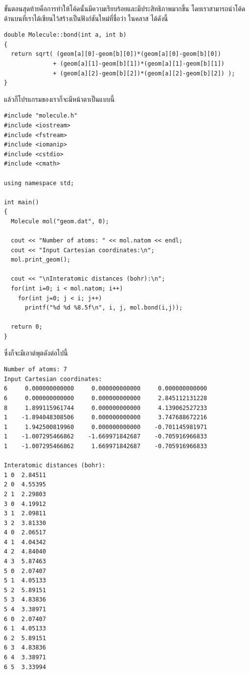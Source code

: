 ขั้นตอนสุดท้ายคือการทำให้โค้ดนั้นมีความเรียบร้อยและมีประสิทธิภาพมากขึ้น โดยเราสามารถนำโค้ดด้านบนที่เราได้เขียนไว้สร้างเป็นฟังก์ชันใหม่ที่ชื่อว่า
 ในคลาส  ได้ดังนี้

\vspace{5pt}

\begin{lstlisting}[style=MyC++]
double Molecule::bond(int a, int b)
{
  return sqrt( (geom[a][0]-geom[b][0])*(geom[a][0]-geom[b][0])
              + (geom[a][1]-geom[b][1])*(geom[a][1]-geom[b][1])
              + (geom[a][2]-geom[b][2])*(geom[a][2]-geom[b][2]) );
}
\end{lstlisting}

\vspace{5pt}

แล้วก็โปรแกรมของเราก็จะมีหน้าตาเป็นแบบนี้

\vspace{5pt}

\begin{lstlisting}[style=MyC++]
#include "molecule.h"
#include <iostream>
#include <fstream>
#include <iomanip>
#include <cstdio>
#include <cmath>

using namespace std;
  
int main()
{
  Molecule mol("geom.dat", 0);
  
  cout << "Number of atoms: " << mol.natom << endl;
  cout << "Input Cartesian coordinates:\n";
  mol.print_geom();
  
  cout << "\nInteratomic distances (bohr):\n";
  for(int i=0; i < mol.natom; i++)
    for(int j=0; j < i; j++)
      printf("%d %d %8.5f\n", i, j, mol.bond(i,j));
      
  return 0;
}
\end{lstlisting}

\vspace{5pt}

\noindent ซึ่งก็จะมีเอาต์พุตดังต่อไปนี้

\vspace{5pt}

\begin{lstlisting}[style=MyC++]
Number of atoms: 7
Input Cartesian coordinates:
6     0.000000000000     0.000000000000     0.000000000000
6     0.000000000000     0.000000000000     2.845112131228
8     1.899115961744     0.000000000000     4.139062527233
1    -1.894048308506     0.000000000000     3.747688672216
1     1.942500819960     0.000000000000    -0.701145981971
1    -1.007295466862    -1.669971842687    -0.705916966833
1    -1.007295466862     1.669971842687    -0.705916966833

Interatomic distances (bohr):
1 0  2.84511
2 0  4.55395
2 1  2.29803
3 0  4.19912
3 1  2.09811
3 2  3.81330
4 0  2.06517
4 1  4.04342
4 2  4.84040
4 3  5.87463
5 0  2.07407
5 1  4.05133
5 2  5.89151
5 3  4.83836
5 4  3.38971
6 0  2.07407
6 1  4.05133
6 2  5.89151
6 3  4.83836
6 4  3.38971
6 5  3.33994
\end{lstlisting}

